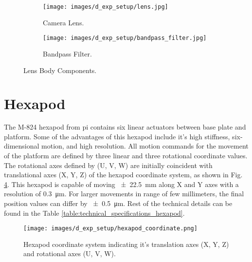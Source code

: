     \begin{figure}[h]
        \begin{subfigure}{0.5\textwidth}
            \centering
            \texttt{[image: images/d\_exp\_setup/lens.jpg]}
            \caption{Camera Lens. \cite{edmund_optics_lens}}
            \label{fig:lens.jpg}
        \end{subfigure}
        \begin{subfigure}{0.5\textwidth}
            \centering
            \texttt{[image: images/d\_exp\_setup/bandpass\_filter.jpg]}
            \caption{Bandpass Filter. \cite{thorlabs_bandpass_filter}}
            \label{fig:bandpass_filter.jpg}
        \end{subfigure}
        \caption{Lens Body Components.}
        \label{fig:lens_body.jpg}
    \end{figure}

\section{Hexapod}
The M-824 hexapod from \gls{pi} contains six linear actuators between base plate and platform. Some of the advantages of this hexapod include it's high stiffness, six-dimensional motion, and high resolution. All motion commands for the movement of the platform are defined by three linear and three rotational coordinate values. The rotational axes defined by (U, V, W) are initially coincident with translational axes (X, Y, Z) of the hexapod coordinate system, as shown in Fig. \ref{fig:hexapod_coordinate.png}. This hexapod is capable of moving \SI{\pm22.5}{\milli\meter} along X and Y axes with a resolution of \SI{0.3}{\micro\meter}. For larger movements in range of few millimeters, the final position values can differ by \SI{\pm0.5}{\micro\meter}. Rest of the technical details can be found in the Table \ref{table:technical_specifications_hexapod}.

\begin{figure}[h]
    \centering
    \texttt{[image: images/d\_exp\_setup/hexapod\_coordinate.png]}
    \caption{Hexapod coordinate system indicating it's translation axes (X, Y, Z) and rotational axes (U, V, W). \cite{hexapod_manual}}
    \label{fig:hexapod_coordinate.png}
\end{figure}

